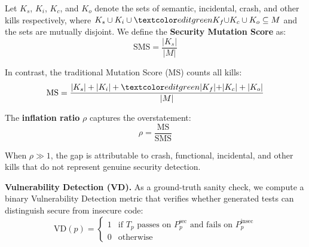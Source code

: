 \documentclass[sigconf,anonymous,review]{acmart}
\begin{document}
\noindent Let $K_s$,  $K_i$, $K_c$, and $K_o$ denote the sets of semantic,  incidental, crash, and other kills respectively, where $K_s \cup K_i \cup \fix{K_f \cup} K_c \cup K_o \subseteq M$ and the sets are mutually disjoint. We define the \textbf{Security Mutation Score} as:
\begin{equation}
    \text{SMS} = \frac{|K_s|}{|M|}
\end{equation}

\noindent In contrast, the traditional Mutation Score (MS) counts all kills:
\begin{equation}
    \text{MS} = \frac{|K_s| + |K_i| + \fix{|K_f| +} |K_c| + |K_o|}{|M|}
\end{equation}

\noindent The \textbf{inflation ratio} $\rho$ captures the overstatement:
\begin{equation}
    \rho = \frac{\text{MS}}{\text{SMS}}
\end{equation}

\noindent When $\rho \gg 1$, the gap is attributable to crash, functional, incidental, and other kills that do not represent genuine security detection.


\textbf{Vulnerability Detection (VD).} As a ground-truth sanity check, we compute a binary Vulnerability Detection metric that verifies whether generated tests can distinguish secure from insecure code:
\begin{equation}
    \text{VD}(p) = \begin{cases} 1 & \text{if } T_p \text{ passes on } P_p^{\text{sec}} \text{ and fails on } P_p^{\text{insec}} \\ 0 & \text{otherwise} \end{cases}
\end{equation}
\end{document}
